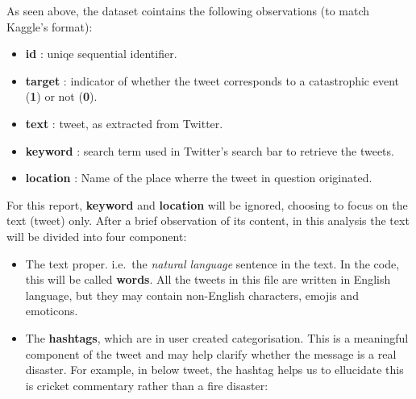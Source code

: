 \documentclass[11pt,]{article}
\providecommand{\tightlist}{%
  \setlength{\itemsep}{0pt}\setlength{\parskip}{0pt}}
\begin{document}
As seen above, the dataset cointains the following observations (to
match Kaggle's format):

\begin{itemize}
\tightlist
\item
  \textbf{id} : uniqe sequential identifier.
\item
  \textbf{target} : indicator of whether the tweet corresponds to a
  catastrophic event (\textbf{1}) or not (\textbf{0}).
\item
  \textbf{text} : tweet, as extracted from Twitter.
\item
  \textbf{keyword} : search term used in Twitter's search bar to
  retrieve the tweets.
\item
  \textbf{location} : Name of the place wherre the tweet in question
  originated.
\end{itemize}

For this report, \textbf{keyword} and \textbf{location} will be ignored,
choosing to focus on the text (tweet) only. After a brief observation of
its content, in this analysis the text will be divided into four
component:

\begin{itemize}
\tightlist
\item
  The text proper. i.e.~the \emph{natural language} sentence in the
  text. In the code, this will be called \textbf{words}. All the tweets
  in this file are written in English language, but they may contain
  non-English characters, emojis and emoticons.
\item
  The \textbf{hashtags}, which are in user created categorisation. This
  is a meaningful component of the tweet and may help clarify whether
  the message is a real disaster. For example, in below tweet, the
  hashtag helps us to ellucidate this is cricket commentary rather than
  a fire disaster:
\end{itemize}

\begin{table}[H]

\caption{\label{tab:tweet_hasthag_example}Tweet about cricket}
\centering
{}
\end{table}
\end{document}
